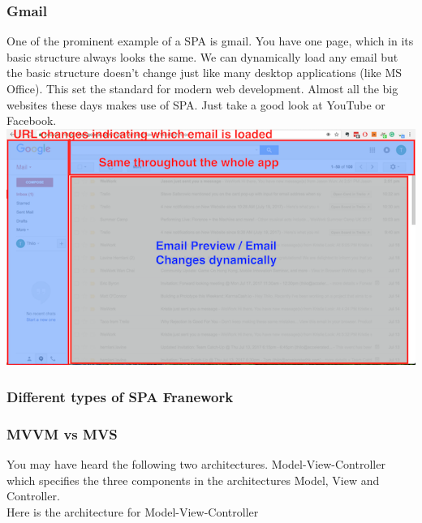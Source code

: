 \documentclass[a4paper]{article}
\begin{document}
\subsubsection{Gmail}
One of the prominent example of a SPA is gmail. You have one page, which in its basic structure always looks the same. We can dynamically load any email but the basic structure doesn’t change just like many desktop applications (like MS Office). This set the standard for modern web development. Almost all the big websites these days makes use of SPA. Just take a good look at YouTube or Facebook.\\

\includegraphics{img/spa.png}\\

\subsubsection{Different types of SPA Franework}

\subsubsection{MVVM vs MVS}
You may have heard the following two architectures. Model-View-Controller which specifies the three components in the architectures Model, View and Controller.\\

Here is the architecture for Model-View-Controller\\
\end{document}
